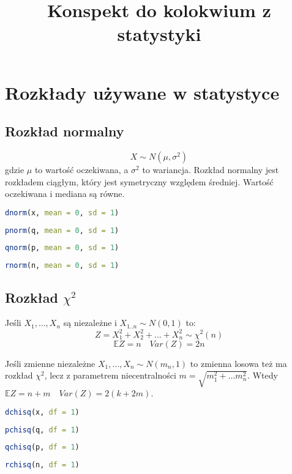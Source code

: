 \documentclass{../notatki}
\title{Konspekt do kolokwium z statystyki}
\begin{document}
\tableofcontents

\section{Rozkłady używane w statystyce}

\subsection{Rozkład normalny}

$$
X \sim N(\mu, \sigma^2)
$$
gdzie $\mu$ to wartość oczekiwana, a $\sigma^2$ to
wariancja. Rozkład normalny jest rozkładem ciągłym, który jest symetryczny
względem średniej. Wartość oczekiwana i mediana są równe.

\begin{lstlisting}[language=R, caption=gęstość w punkcie x]
dnorm(x, mean = 0, sd = 1)
\end{lstlisting}
\begin{lstlisting}[language=R, caption=dystrybuanta]
pnorm(q, mean = 0, sd = 1)
\end{lstlisting}
\begin{lstlisting}[language=R, caption=kwantyl p-tego percentyla]
qnorm(p, mean = 0, sd = 1)
\end{lstlisting}
\begin{lstlisting}[language=R, caption=n losowych zmiennych z rozkładu normalnego]
rnorm(n, mean = 0, sd = 1)
\end{lstlisting}

\subsection{Rozkład \texorpdfstring{$\chi^2$}{chi-kwadrat}}

Jeśli $X_1,\dots, X_n$ są niezależne i $X_{1..n} \sim N(0, 1)$ to:
$$
Z = X_1^2 + X_2^2 + \dots + X_n^2 \sim \chi^2(n)
$$
$$
\mathbb{E} Z = n \quad Var(Z) = 2n
$$

Jeśli zmienne niezależne $X_1, \dots, X_n \sim N(m_n, 1)$ to zmienna losowa też
ma rozkład $\chi^2$, lecz z parametrem niecentralności $m =
\sqrt{m_1^2 + \dots m_n^2}$.
Wtedy $\mathbb{E} Z = n + m \quad Var(Z) = 2(k + 2m)$.

\begin{lstlisting}[language=R, caption=gęstość w punkcie x]
dchisq(x, df = 1)
\end{lstlisting}
\begin{lstlisting}[language=R, caption=dystrybuanta]
pchisq(q, df = 1)
\end{lstlisting}
\begin{lstlisting}[language=R, caption=kwantyl p-tego percentyla]
qchisq(p, df = 1)
\end{lstlisting}
\begin{lstlisting}[language=R, caption=n losowych zmiennych z rozkładu chi-kwadrat]
rchisq(n, df = 1)
\end{lstlisting}
\end{document}
